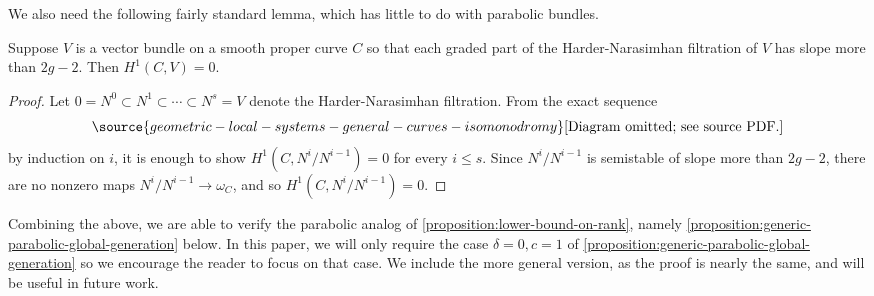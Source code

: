 We also need the following fairly standard lemma, which has little to do with
parabolic bundles.
\begin{lemma}
\notready
	\label{lemma:cohomology-vanish-for-large-slope}
	Suppose $V$ is a vector bundle on a smooth proper curve $C$ so that each
	graded part of the Harder-Narasimhan filtration of $V$ has slope more
	than $2g - 2$. Then $H^1(C, V) = 0$.
\end{lemma}
\begin{proof}
	Let $0= N^0 \subset N^1 \subset \cdots \subset N^s = V$ denote the
	Harder-Narasimhan filtration.
	From the exact sequence
	\begin{equation}
		\label{equation:}
\source{geometric-local-systems-general-curves-isomonodromy}
		\text{[Diagram omitted; see source PDF.]}\end{equation}
	by induction on $i$, it is enough to show $H^1(C, N^i/N^{i-1}) = 0$ for
	every $i \leq s$.
	Since $N^i/N^{i-1}$ is semistable of slope more than $2g-2$, there are
	no nonzero maps $N^i/N^{i-1} \to \omega_C$, and so
	$H^1(C, N^i/N^{i-1}) = 0$.
\end{proof}

Combining the above, we are able to verify the parabolic analog of
\autoref{proposition:lower-bound-on-rank}, namely \autoref{proposition:generic-parabolic-global-generation} below.
In this paper, we will only require the case $\delta = 0, c = 1$
of \autoref{proposition:generic-parabolic-global-generation}
so we encourage the reader to focus on that case.
We include the more general version, as the proof is nearly the same,
and will be useful in future work.

